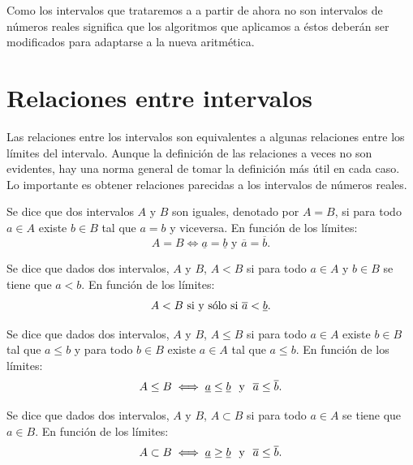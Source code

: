 Como los intervalos que trataremos a a partir de ahora no son intervalos de números reales significa que los algoritmos que aplicamos a éstos deberán ser modificados para adaptarse a la nueva aritmética.

\section{Relaciones entre intervalos}

Las relaciones entre los intervalos son equivalentes a algunas relaciones entre los límites del intervalo. Aunque la definición de las relaciones a veces no son evidentes, hay una norma general de tomar la definición más útil en cada caso. Lo importante es obtener relaciones parecidas a los intervalos de números reales.

\begin{definition}
Se dice que dos intervalos $A$ y $B$ son iguales, denotado por $A = B$, si para todo $a \in A$ existe $b \in B$ tal que $a = b$ y viceversa. En función de los límites:
$$A = B \iff \underline{a} = \underline{b} \text{ y } \overline{a} = \overline{b}.$$
\end{definition}

\begin{definition}
Se dice que dados dos intervalos, $A$ y $B$, $A < B$ si para todo $a \in A$ y $b \in B$ se tiene que $a < b$. En función de los límites:
$$A < B \hbox{ si y sólo si } \overline{a} < \underline{b}.$$
\end{definition}

\begin{definition}
Se dice que dados dos intervalos, $A$ y $B$, $A \leq B$ si para todo $a \in A$ existe $b \in B$ tal que $a \leq b$ y para todo $b \in B$ existe $a \in A$ tal que $a \leq b$. En función de los límites:
$$A \leq B \iff \underline{a} \leq \underline{b} \hspace{0.25cm} \text{y} \hspace{0.25cm} \overline{a} \leq \overline{b}.$$
\end{definition}

\begin{definition}
Se dice que dados dos intervalos, $A$ y $B$, $A \subset B$ si para todo $a \in A$ se tiene que $a \in B$. En función de los límites:
$$A \subset B \iff \underline{a} \geq \underline{b} \hspace{0.25cm} \text{y} \hspace{0.25cm} \overline{a} \leq \overline{b}.$$
\end{definition}

